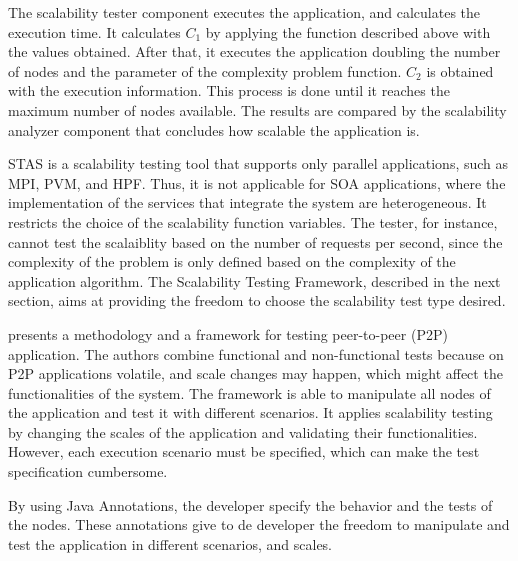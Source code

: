 The scalability tester component executes the application, and calculates the execution time.  It calculates $C_1$ by applying the function described above with the values obtained. After that, it executes the application doubling the number of nodes and the parameter of the complexity problem function. $C_2$ is obtained with the execution information. This process is done until it reaches the maximum number of nodes available. The results are compared by the scalability analyzer component that concludes how scalable the application is.

STAS is a scalability testing tool that supports only parallel applications, such as MPI, PVM, and HPF. Thus, it is not applicable for SOA applications, where the implementation of the services that integrate the system are heterogeneous. It restricts the choice of the scalability function variables. The tester, for instance, cannot test the scalaiblity based on the number of requests per second, since the complexity of the problem is only defined based on the complexity of the application algorithm. The Scalability Testing Framework, described in the next section, aims at providing the freedom to choose the scalability test type desired.

\cite{p2p} presents a methodology and a framework for testing peer-to-peer (P2P) application. The authors combine functional and non-functional tests because on P2P applications volatile, and scale changes may happen, which might affect the functionalities of the system. The framework is able to manipulate all nodes of the application and test it with different scenarios. It applies scalability testing by changing the scales of the application and validating their functionalities. However, each execution scenario must be specified, which can make the test specification cumbersome.

By using Java Annotations, the developer specify the behavior and the tests of the nodes. These annotations give to de developer the freedom to manipulate and test the application in different scenarios, and scales.











